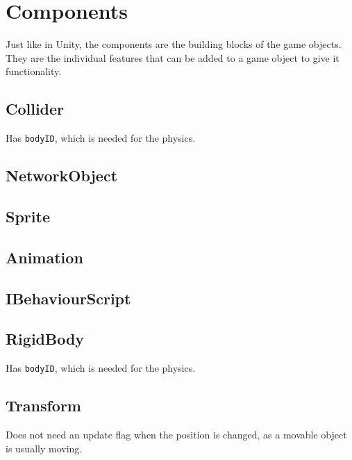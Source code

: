 \section{Components}
Just like in Unity, the components are the building blocks of the game objects.
They are the individual features that can be added to a game object to give it functionality.

\subsection{Collider}
Has \texttt{bodyID}, which is needed for the physics.

\subsection{NetworkObject}

\subsection{Sprite}

\subsection{Animation}

\subsection{IBehaviourScript}

\subsection{RigidBody}
Has \texttt{bodyID}, which is needed for the physics.

\subsection{Transform}

Does not need an update flag when the position is changed, as a movable object is usually moving.


